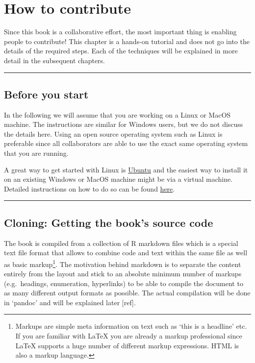 \documentclass[]{book}
\let\rmarkdownfootnote\footnote%
\def\footnote{\protect\rmarkdownfootnote}
\begin{document}
\chapter{How to contribute}\label{chptr-how-to-contribute}

Since this book is a collaborative effort, the most important thing is
enabling people to contribute! This chapter is a hands-on tutorial and
does not go into the details of the required steps. Each of the
techniques will be explained in more detail in the subsequent chapters.

\begin{center}\rule{0.5\linewidth}{\linethickness}\end{center}

\section{Before you start}\label{before-you-start}

In the following we will assume that you are working on a Linux or MacOS
machine. The instructions are similar for Windows users, but we do not
discuss the details here. Using an open source operating system such as
Linux is preferable since all collaborators are able to use the exact
same operating system that you are running.

A great way to get started with Linux is
\href{https://www.ubuntu.com/download/desktop}{Ubuntu} and the easiest
way to install it on an existing Windows or MacOS machine might be via a
virtual machine. Detailed instructions on how to do so can be found
\href{https://www.wikihow.com/Install-Ubuntu-on-VirtualBox}{here}.

\begin{center}\rule{0.5\linewidth}{\linethickness}\end{center}

\section{Cloning: Getting the book's source
code}\label{cloning-getting-the-books-source-code}

The book is compiled from a collection of R markdown files which is a
special text file format that allows to combine code and text within the
same file as well as basic markup\footnote{Markups are simple meta
  information on text such as `this is a headline' etc. If you are
  familiar with LaTeX you are already a markup professional since LaTeX
  supports a huge number of different markup expressions. HTML is also a
  markup language.}. The motivation behind markdown is to separate the
content entirely from the layout and stick to an absolute minimum number
of markups (e.g.~headings, enumeration, hyperlinks) to be able to
compile the document to as many different output formats as possible.
The actual compilation will be done in `pandoc' and will be explained
later {[}ref{]}.
\end{document}
